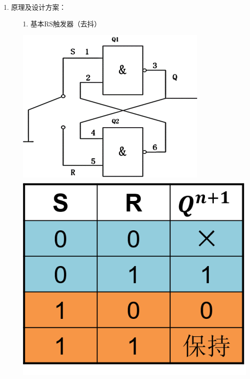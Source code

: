 \documentclass[UTF8]{ctexart}
\begin{document}
\begin{enumerate}
      \large
      \vspace{1\baselineskip}
      \item 原理及设计方案：  \\
            \begin{itemize}
                  \item [1.] 基本RS触发器（去抖） \\
                        \begin{center}  
                              \includegraphics[scale=0.6]{1.png}
                              \includegraphics[scale=0.6]{2.png}
                        \end{center}


\end{itemize}
\end{enumerate}
\end{document}
